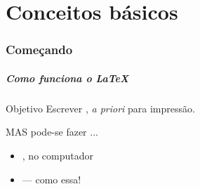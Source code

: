 
\part{Conceitos básicos}

\section{Começando}

\begin{frame}
  \frametitle{Como funciona o \LaTeX}

  \begin{block}{Objetivo}
    Escrever , \textit{a priori} para impressão.
  \end{block}


  \bigskip

  MAS pode-se fazer ...

  \begin{itemize}
  \item {}, no computador
  \item {} --- como essa!
  \end{itemize}

\end{frame}

